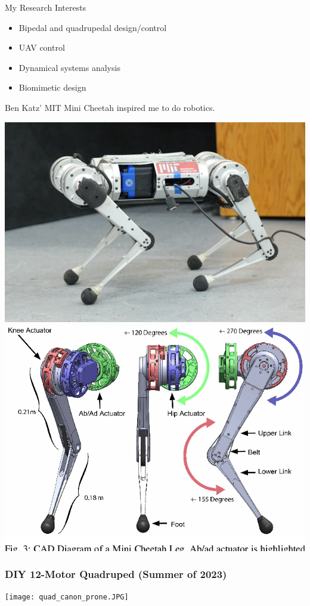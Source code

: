 \documentclass[14pt]{beamer}
\begin{document}
	\begin{frame}{My Research Interests}
		\begin{itemize}
			\item Bipedal and quadrupedal design/control
			\item UAV control
			\item Dynamical systems analysis
			\item Biomimetic design
		\end{itemize}
		\vspace{0.5cm}
		Ben Katz' MIT Mini Cheetah inspired me to do robotics.
		\begin{center}
			\includegraphics[height=15ex]{minicheetah-stand2.png}
			\includegraphics[height=15ex]{cheetah_leg.png}
		\end{center}
		\vspace{1cm}
	\end{frame}
	
	\begin{frame}
		\frametitle{DIY 12-Motor Quadruped \small{(Summer of 2023)}}
		
		\texttt{[image: quad\_canon\_prone.JPG]}
	\end{frame}
	
\end{document}
